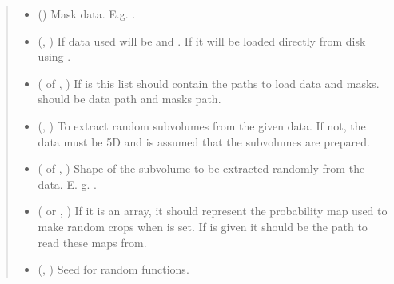 \documentclass[letterpaper,10pt,english]{sphinxmanual}
\begin{document}
\begin{fulllineitems}
\begin{quote}
\begin{description}
\begin{itemize}
\item {} 
 () \textendash{} Mask data. E.g. .

\item {} 
 (, ) \textendash{} If  data used will be  and . If  it will be loaded directly from disk using
.

\item {} 
 ( of , ) \textendash{} If  is  this list should contain the paths to load data and masks. 
should be data path and  masks path.

\item {} 
 (, ) \textendash{} To extract random subvolumes from the given data. If not, the data must be 5D and is assumed that the
subvolumes are prepared.

\item {} 
 ( of , ) \textendash{} Shape of the subvolume to be extracted randomly from the data. E. g. .

\item {} 
 ( or , ) \textendash{} If it is an array, it should represent the probability map used to make random crops when
 is set. If  is given it should be the path to read these maps from.

\item {} 
 (, ) \textendash{} Seed for random functions.


\end{itemize}
\end{description}
\end{quote}
\end{fulllineitems}
\end{document}
